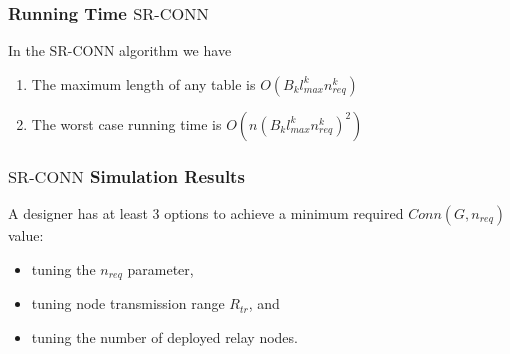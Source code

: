 \documentclass{beamer}
\newcommand{\SRCONN}   { {\mathrm {SR\mbox{-}CONN}} }
\begin{document}
\begin{frame}
\frametitle{Running Time $\SRCONN$}
\begin{theorem}\normalfont In the $\SRCONN$ algorithm we have\label{thm:rt1}
\begin{enumerate}
\item The maximum length of any table is $O(B_kl_{max}^kn_{req}^k)$ 
\item The worst case running time is $O(n(B_kl_{max}^kn_{req}^k)^2)$
\end{enumerate}
\end{theorem}
\end{frame}
\begin{frame}
\frametitle{$\SRCONN$ Simulation Results}
A designer has at least 3 options to achieve a minimum required $Conn(G,n_{req})$ value:

\begin{itemize}
\item tuning the $n_{req}$ parameter,
\item tuning node transmission range $R_{tr}$, and
\item tuning the number of deployed relay nodes.
\end{itemize}
\end{frame}
\end{document}
